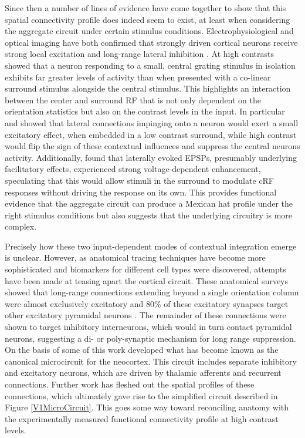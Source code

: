 Since then a number of lines of evidence have come together to show
that this spatial connectivity profile does indeed seem to exist, at
least when considering the aggregate circuit under certain stimulus
conditions. Electrophysiological and optical imaging have both
confirmed that strongly driven cortical neurons receive strong local
excitation and long-range lateral inhibition
\citep{Grinvald1994,Sceniak2001}. At high contrasts
\cite{Grinvald1994} showed that a neuron responding to a small,
central grating stimulus in isolation exhibits far greater levels of
activity than when presented with a co-linear surround stimulus
alongside the central stimulus. This highlights an interaction between
the center and surround RF that is not only dependent on the
orientation statistics but also on the contrast levels in the
input. In particular \cite{Hirsch1991} and \cite{Weliky1995} showed
that lateral connections impinging onto a neuron would exert a small
excitatory effect, when embedded in a low contrast surround, while
high contrast would flip the sign of these contextual influences and
suppress the central neurons activity. Additionally, \cite{Hirsch1991}
found that laterally evoked EPSPs, presumably underlying facilitatory
effects, experienced strong voltage-dependent enhancement, speculating
that this would allow stimuli in the surround to modulate cRF
responses without driving the response on its own.  This provides
functional evidence that the aggregate circuit can produce a Mexican
hat profile under the right stimulus conditions but also suggests that
the underlying circuitry is more complex.

Precisely how these two input-dependent modes of contextual
integration emerge is unclear. However, as anatomical tracing
techniques have become more sophisticated and biomarkers for different
cell types were discovered, attempts have been made at teasing apart
the cortical circuit. These anatomical surveys showed that long-range
connections extending beyond a single orientation column were almost
exclusively excitatory and 80\% of these excitatory synapses target
other excitatory pyramidal neurons
\citep{Hirsch1991,Kisvarday1997a}. The remainder of these connections
were shown to target inhibitory interneurons, which would in turn
contact pyramidal neurons, suggesting a di- or poly-synaptic mechanism
for long range suppression. On the basis of some of this work
\cite{Douglas1991} developed what has become known as the canonical
microcircuit for the neocortex. This circuit includes separate
inhibitory and excitatory neurons, which are driven by thalamic
afferents and recurrent connections. Further work has fleshed out the
spatial profiles of these connections, which ultimately gave rise to
the simplified circuit described in Figure \ref{V1MicroCircuit}. This
goes some way toward reconciling anatomy with the experimentally
measured functional connectivity profile at high contrast levels.

